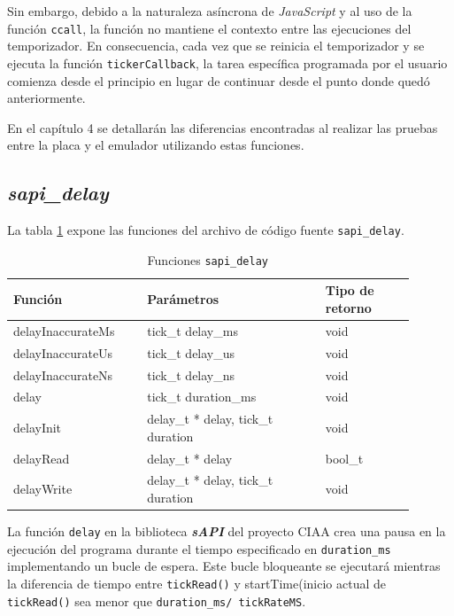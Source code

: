 Sin embargo, debido a la naturaleza asíncrona de \textit{JavaScript} y al uso de la función \texttt{ccall}, la función no mantiene el contexto entre las ejecuciones del temporizador. En consecuencia, cada vez que se reinicia el temporizador y se ejecuta la función  \texttt{tickerCallback}, la tarea específica programada por el usuario comienza desde el principio en lugar de continuar desde el punto donde quedó anteriormente. 

En el capítulo 4 se detallarán las diferencias encontradas al realizar las pruebas entre la placa y el emulador utilizando estas funciones.

\newpage
\subsection{\textit{\textbf{sapi\_delay}}}

La tabla \ref{tab:sapiDelay} expone las funciones del archivo de código fuente \texttt{sapi\_delay}.

\begin{table}[h]
	\centering
	\caption[Funciones \texttt{sapi\_delay}]{Funciones \texttt{sapi\_delay}}
	\begin{tabular}{p{0.30\linewidth} p{0.40\linewidth}  p{0.20\linewidth}}    
		\toprule
		\textbf{Función} 	 & \textbf{Parámetros} 		& \textbf{Tipo de retorno}  \\
		\midrule
		delayInaccurateMs & tick\_t delay\_ms 		&  void \\		
		delayInaccurateUs	 & tick\_t delay\_us			&  void \\
		delayInaccurateNs	 & tick\_t delay\_ns				& void \\
		delay	 & tick\_t duration\_ms				&  void \\
		delayInit & delay\_t * delay, tick\_t duration 		&  void \\
		delayRead & delay\_t * delay 		&  bool\_t \\
		delayWrite & delay\_t * delay, tick\_t duration 		&  void \\	
		\bottomrule
		\hline
	\end{tabular}
	\label{tab:sapiDelay}
\end{table}

La función \texttt{delay} en la biblioteca \textit{\textbf{sAPI}} del proyecto CIAA crea una pausa en la ejecución del programa durante el tiempo especificado en \texttt{duration\_ms} implementando un bucle de espera. Este bucle bloqueante se ejecutará mientras la diferencia de tiempo entre \texttt{tickRead()} y startTime(inicio actual de \texttt{tickRead()} sea menor que \texttt{duration\_ms/ tickRateMS}.

